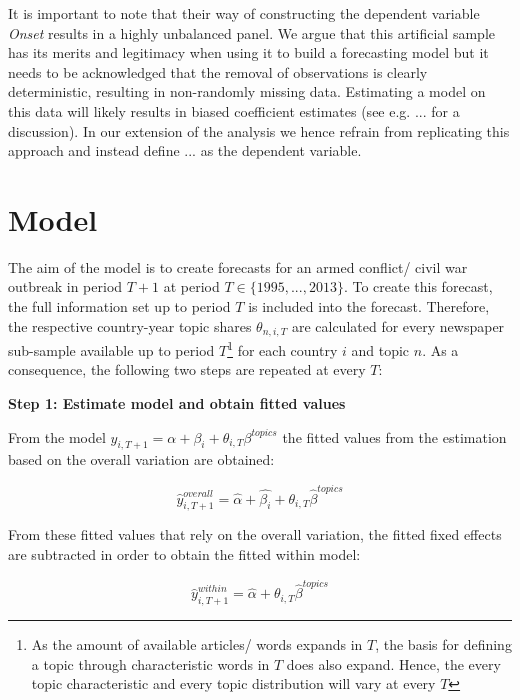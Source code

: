 It is important to note that their way of constructing the dependent variable \textit{Onset} results in a highly unbalanced panel.
We argue that this artificial sample has its merits and legitimacy when using it to build a forecasting model but it needs to be acknowledged that the removal of observations is clearly deterministic, resulting in non-randomly missing data.
Estimating a model on this data will likely results in biased coefficient estimates (see e.g. ... for a discussion).
In our extension of the analysis we hence refrain from replicating this approach and instead define ... as the dependent variable.


\section{Model}
The aim of the model is to create forecasts for an armed conflict/ civil war outbreak in period $T+1$ at period $T \in \{1995,..., 2013\}$.
To create this forecast, the full information set up to period $T$ is included into the forecast.
Therefore, the respective country-year topic shares $\theta_{n,i,T}$ are calculated for every newspaper sub-sample available up to period $T$\footnote{As the amount of available articles/ words expands in $T$, the basis for defining a topic through characteristic words in $T$ does also expand. Hence, the every topic characteristic and every topic distribution will vary at every $T$} for each country $i$ and topic $n$.
As a consequence, the following two steps are repeated at every $T$:

\noindent\textbf{Step 1: Estimate model and obtain fitted values}

\noindent From the model $y_{i,T+1} = \alpha + \beta_{i} + \theta_{i,T}\beta^{topics}$ the fitted values from the estimation based on the overall variation are obtained:

\begin{equation}
    \hat{y}_{i,T+1}^{overall} = \hat{\alpha} + \hat{\beta_i} + \theta_{i,T}\hat{\beta}^{topics}
\end{equation}

\noindent From these fitted values that rely on the overall variation, the fitted fixed effects are subtracted in order to obtain the fitted within model:

\begin{equation}
    \hat{y}_{i,T+1}^{within} = \hat{\alpha} + \theta_{i,T}\hat{\beta}^{topics}
\end{equation}

